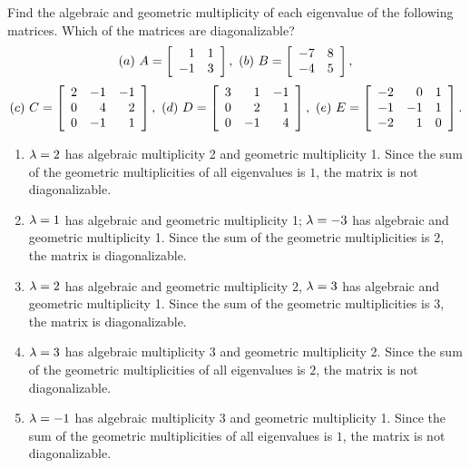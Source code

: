 \documentclass{ximera}
\author{Zack Reed}
\begin{document}
\begin{problem}
  Find the algebraic and geometric multiplicity of each eigenvalue of
  the following matrices. Which of the matrices are diagonalizable?
  \begin{equation*}
    (a)\quad
    A = \startmat{rr} 1 & 1 \\ -1 & 3 \stopmat,
    \quad
    (b)\quad
    B = \startmat{rr} -7 & 8 \\ -4 & 5 \stopmat,
  \end{equation*}
  \begin{equation*}
    (c)\quad
    C = \startmat{rrr}
      2 & -1 & -1 \\
      0 & 4 & 2 \\
      0 & -1 & 1 \\
    \stopmat,
    \quad
    (d)\quad
    D = \startmat{rrr}
      3 & 1 & -1 \\
      0 & 2 & 1 \\
      0 & -1 & 4 \\
    \stopmat,
    \quad
    (e)\quad
    E = \startmat{rrr}
      -2 & 0 & 1 \\
      -1 & -1 & 1 \\
      -2 & 1 & 0 \\
    \stopmat.
  \end{equation*}
  \begin{solution}
    \begin{enumerate}
    \item $\eigenvar=2$ has algebraic multiplicity 2 and geometric
      multiplicity 1. Since the sum of the geometric multiplicities of
      all eigenvalues is $1$, the matrix is not diagonalizable.
    \item $\eigenvar=1$ has algebraic and geometric
      multiplicity 1; $\eigenvar=-3$ has algebraic and geometric
      multiplicity 1. Since the sum of the geometric multiplicities is
      $2$, the matrix is diagonalizable.
    \item $\eigenvar=2$ has algebraic and geometric
      multiplicity 2, $\eigenvar=3$ has algebraic and geometric
      multiplicity 1. Since the sum of the geometric multiplicities is
      $3$, the matrix is diagonalizable.
    \item $\eigenvar=3$ has algebraic multiplicity 3 and geometric
      multiplicity 2. Since the sum of the geometric multiplicities of
      all eigenvalues is $2$, the matrix is not diagonalizable.
    \item $\eigenvar = -1$ has algebraic multiplicity 3 and geometric
      multiplicity 1. Since the sum of the geometric multiplicities of
      all eigenvalues is $1$, the matrix is not diagonalizable.
    \end{enumerate}
  \end{solution}
\end{problem}
\end{document}
